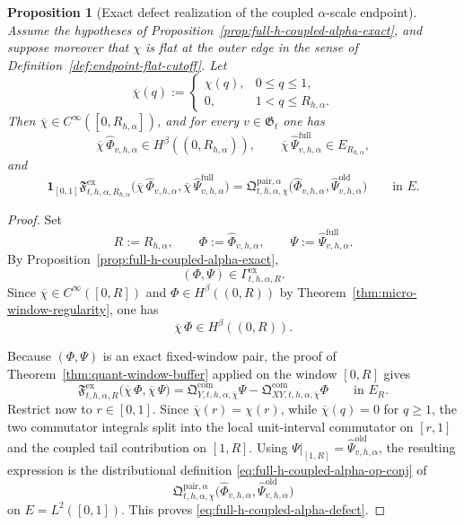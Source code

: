 \documentclass[11pt,a4paper]{amsart}
\theoremstyle{plain}
\newtheorem{proposition}[theorem]{Proposition}
\theoremstyle{definition}
\theoremstyle{remark}
\newcommand{\one}{\mathbf 1}
\begin{document}
\begin{proposition}[Exact defect realization of the coupled \(\alpha\)-scale endpoint]
\label{prop:full-h-coupled-alpha-defect}
Assume the hypotheses of Proposition~\ref{prop:full-h-coupled-alpha-exact}, and suppose moreover
that \(\chi\) is flat at the outer edge in the sense of Definition~\ref{def:endpoint-flat-cutoff}.
Let
\[
\overline\chi(q)
:=
\begin{cases}
\chi(q), & 0\le q\le1,\\
0, & 1<q\le R_{h,\alpha}.
\end{cases}
\]
Then \(\overline\chi\in C^\infty([0,R_{h,\alpha}])\), and for every \(v\in\mathfrak G_t\) one has
\[
\overline\chi\,\widehat\Phi_{v,h,\alpha}\in H^\beta((0,R_{h,\alpha})),
\qquad
\overline\chi\,\widehat\Psi_{v,h,\alpha}^{\mathrm{full}}\in E_{R_{h,\alpha}},
\]
and
\begin{equation}\label{eq:full-h-coupled-alpha-defect}
\one_{[0,1]}
\mathfrak F_{t,h,\alpha,R_{h,\alpha}}^{\mathrm{ex}}
\bigl(
\overline\chi\,\widehat\Phi_{v,h,\alpha},
\overline\chi\,\widehat\Psi_{v,h,\alpha}^{\mathrm{full}}
\bigr)
=
\mathfrak Q_{t,h,\alpha,\chi}^{\mathrm{pair},\alpha}
\bigl(
\widehat\Phi_{v,h,\alpha},
\widehat\Psi_{v,h,\alpha}^{\mathrm{old}}
\bigr)
\qquad\text{in }E.
\end{equation}
\end{proposition}

\begin{proof}
Set
\[
R:=R_{h,\alpha},
\qquad
\Phi:=\widehat\Phi_{v,h,\alpha},
\qquad
\Psi:=\widehat\Psi_{v,h,\alpha}^{\mathrm{full}}.
\]
By Proposition~\ref{prop:full-h-coupled-alpha-exact},
\[
(\Phi,\Psi)\in \Gamma_{t,h,\alpha,R}^{\mathrm{ex}}.
\]
Since \(\overline\chi\in C^\infty([0,R])\) and \(\Phi\in H^\beta((0,R))\) by
Theorem~\ref{thm:micro-window-regularity}, one has
\[
\overline\chi\,\Phi\in H^\beta((0,R)).
\]

Because \((\Phi,\Psi)\) is an exact fixed-window pair, the proof of
Theorem~\ref{thm:quant-window-buffer} applied on the window \([0,R]\) gives
\[
\mathfrak F_{t,h,\alpha,R}^{\mathrm{ex}}
\bigl(
\overline\chi\,\Phi,
\overline\chi\,\Psi
\bigr)
=
\mathfrak Q_{Y,t,h,\alpha,\overline\chi}^{\mathrm{com}}\Psi
-
\mathfrak Q_{XY,t,h,\alpha,\overline\chi}^{\mathrm{com}}\Phi
\qquad\text{in }E_R.
\]
Restrict now to \(r\in[0,1]\). Since \(\overline\chi(r)=\chi(r)\), while
\(\overline\chi(q)=0\) for \(q\ge1\), the two commutator integrals split into the local
unit-interval commutator on \([r,1]\) and the coupled tail contribution on \([1,R]\).  Using
\(\Psi|_{[1,R]}=\widehat\Psi_{v,h,\alpha}^{\mathrm{old}}\), the resulting expression is the
distributional definition \eqref{eq:full-h-coupled-alpha-op-conj} of
\[
\mathfrak Q_{t,h,\alpha,\chi}^{\mathrm{pair},\alpha}
\bigl(
\widehat\Phi_{v,h,\alpha},
\widehat\Psi_{v,h,\alpha}^{\mathrm{old}}
\bigr)
\]
on \(E=L^2([0,1])\). This proves \eqref{eq:full-h-coupled-alpha-defect}.
\end{proof}
\end{document}
